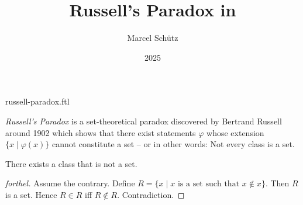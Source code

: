 \documentclass{stex}
\title{Russell's Paradox in \Naproche}
\author{Marcel Schütz}
\date{2025}
\begin{document}
\begin{smodule}{russell-paradox.ftl}
\maketitle

\noindent \emph{Russell's Paradox} is a set-theoretical paradox discovered by
Bertrand Russell around 1902 \cite[chapter XV]{Frege1980} which shows that 
there exist statements $\varphi$ whose extension
$\{x\mid\varphi(x)\}$ cannot constitute a set -- or in other words:
Not every class is a set.

\begin{forthel}
  \begin{theorem}[title=Russell's Paradox]
    There exists a class that is not a set.
  \end{theorem}
  \begin{proof}[forthel]
    Assume the contrary.
    Define $R = \{x \mid x \text{ is a set such that } x \notin x\}$.
    Then $R$ is a set.
    Hence $R \in R$ iff $R \notin R$.
    Contradiction.
  \end{proof}
\end{forthel}

\printbibliography
{}
\end{smodule}
\end{document}
